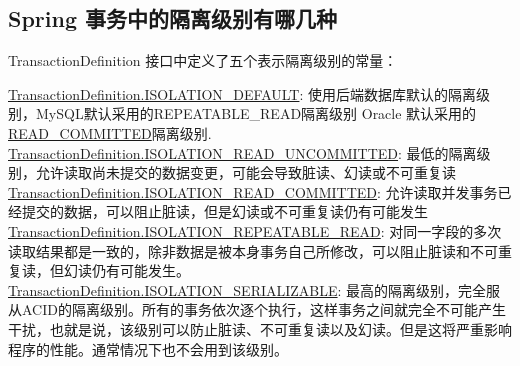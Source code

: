 \documentclass[../../../interview-questions.tex]{subfiles}
\begin{document}
\subsection{Spring 事务中的隔离级别有哪几种}

TransactionDefinition 接口中定义了五个表示隔离级别的常量：

\url{TransactionDefinition.ISOLATION\_DEFAULT}:  使用后端数据库默认的隔离级别，MySQL默认采用的REPEATABLE\_READ隔离级别 Oracle 默认采用的 \url{READ\_COMMITTED}隔离级别.
\url{TransactionDefinition.ISOLATION\_READ\_UNCOMMITTED}: 最低的隔离级别，允许读取尚未提交的数据变更，可能会导致脏读、幻读或不可重复读
\url{TransactionDefinition.ISOLATION\_READ\_COMMITTED}:   允许读取并发事务已经提交的数据，可以阻止脏读，但是幻读或不可重复读仍有可能发生
\url{TransactionDefinition.ISOLATION\_REPEATABLE\_READ}:  对同一字段的多次读取结果都是一致的，除非数据是被本身事务自己所修改，可以阻止脏读和不可重复读，但幻读仍有可能发生。
\url{TransactionDefinition.ISOLATION\_SERIALIZABLE}:   最高的隔离级别，完全服从ACID的隔离级别。所有的事务依次逐个执行，这样事务之间就完全不可能产生干扰，也就是说，该级别可以防止脏读、不可重复读以及幻读。但是这将严重影响程序的性能。通常情况下也不会用到该级别。
\end{document}
